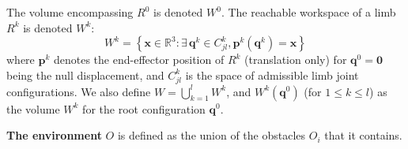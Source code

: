 \medskip
The volume encompassing $R^0$ is denoted $W^0$.
 The reachable workspace of a limb $R^k$ is denoted $W^k$: %
\begin{equation}
  W^k = \left\{ {\mathbf{x} \in \mathbb{R}^3: \exists \, \mathbf{q}^k \in C^k_{jl}, \mathbf{p}^k(\mathbf{q}^k) = \mathbf{x} } \right\}
\end{equation}
where $\mathbf{p}^k$ denotes the end-effector position of $R^k$ (translation only) for $\mathbf{q}^0 = \mathbf{0}$ being the null displacement, and  $C^k_{jl}$ is the space
of admissible limb joint configurations. We also define \mbox{$W = \bigcup_{k=1}^{l}W^k$}, and
$W^k(\mathbf{q}^{0})$ (for $1 \leq k \leq l$) as the volume $W^k$ for the root configuration $\mathbf{q}^{0}$.

\medskip
\textbf{The environment} $O$ is defined as the union of the obstacles $O_i$ that it contains.
